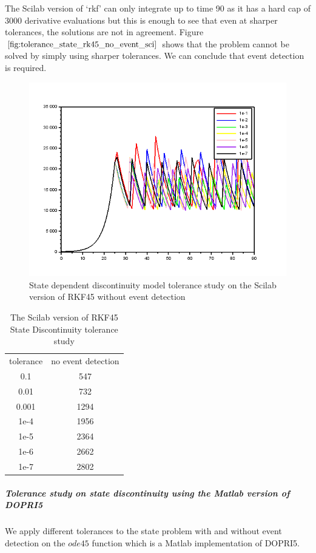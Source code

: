 The Scilab version of `rkf' can only integrate up to time 90 as it has a hard cap of 3000 derivative evaluations but this is enough to see that even at sharper tolerances, the solutions are not in agreement. Figure $\ref{fig:tolerance_state_rk45_no_event_sci}$ shows that the problem cannot be solved by simply using sharper tolerances. We can conclude that event detection is required. 

\begin{figure}[h]
\centering
\includegraphics[width=0.7\linewidth]{./figures/tolerance_state_rk45_no_event_sci}
\caption{State dependent discontinuity model tolerance study on the Scilab version of RKF45 without event detection}
\label{fig:tolerance_state_rk45_no_event_sci}
\end{figure}

\begin{table}[h]
\caption {The Scilab version of RKF45 State Discontinuity tolerance study} \label{tab:tolerance_state_discontinuity_rk45_scilab} 
\begin{center}
\begin{tabular}{ c c }
tolerance & no event detection \\ 
0.1 & 547 \\
0.01 & 732 \\
0.001 & 1294 \\
1e-4 & 1956 \\
1e-5 & 2364 \\
1e-6 & 2662 \\
1e-7 & 2802 \\
\end{tabular}
\end{center}
\end{table}

\subparagraph{Tolerance study on state discontinuity using the Matlab version of DOPRI5}
We apply different tolerances to the state problem with and without event detection on the $ode45$ function which is a Matlab implementation of DOPRI5.

